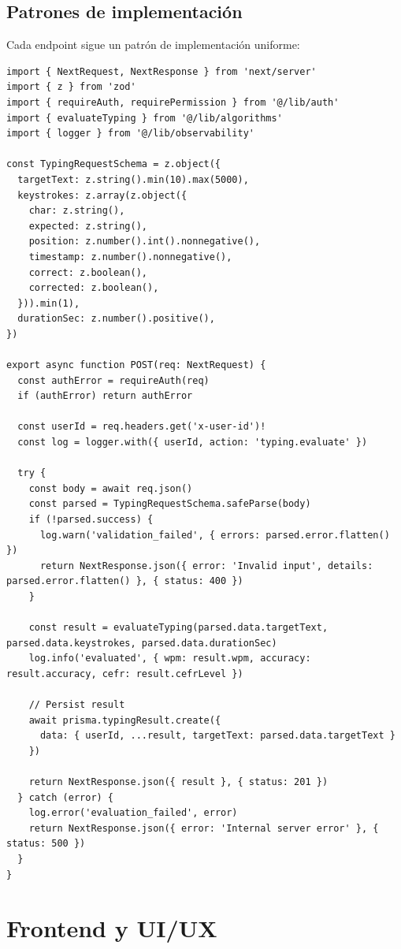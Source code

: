 \documentclass[10pt,a4paper,oneside]{report}
\begin{document}
\section{Patrones de implementación}
Cada endpoint sigue un patrón de implementación uniforme:

\begin{lstlisting}[style=ts,caption={Ejemplo: endpoint POST /api/typing}]
import { NextRequest, NextResponse } from 'next/server'
import { z } from 'zod'
import { requireAuth, requirePermission } from '@/lib/auth'
import { evaluateTyping } from '@/lib/algorithms'
import { logger } from '@/lib/observability'

const TypingRequestSchema = z.object({
  targetText: z.string().min(10).max(5000),
  keystrokes: z.array(z.object({
    char: z.string(),
    expected: z.string(),
    position: z.number().int().nonnegative(),
    timestamp: z.number().nonnegative(),
    correct: z.boolean(),
    corrected: z.boolean(),
  })).min(1),
  durationSec: z.number().positive(),
})

export async function POST(req: NextRequest) {
  const authError = requireAuth(req)
  if (authError) return authError

  const userId = req.headers.get('x-user-id')!
  const log = logger.with({ userId, action: 'typing.evaluate' })

  try {
    const body = await req.json()
    const parsed = TypingRequestSchema.safeParse(body)
    if (!parsed.success) {
      log.warn('validation_failed', { errors: parsed.error.flatten() })
      return NextResponse.json({ error: 'Invalid input', details: parsed.error.flatten() }, { status: 400 })
    }

    const result = evaluateTyping(parsed.data.targetText, parsed.data.keystrokes, parsed.data.durationSec)
    log.info('evaluated', { wpm: result.wpm, accuracy: result.accuracy, cefr: result.cefrLevel })

    // Persist result
    await prisma.typingResult.create({
      data: { userId, ...result, targetText: parsed.data.targetText }
    })

    return NextResponse.json({ result }, { status: 201 })
  } catch (error) {
    log.error('evaluation_failed', error)
    return NextResponse.json({ error: 'Internal server error' }, { status: 500 })
  }
}
\end{lstlisting}


\chapter{Frontend y UI/UX}
\end{document}
